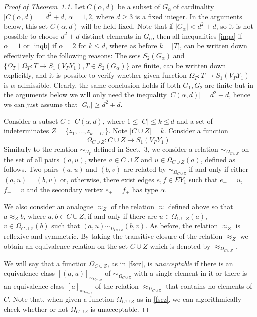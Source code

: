 \documentclass[10pt, reqno]{amsart}
\numberwithin{equation}{section}
\begin{document}
\begin{proof}[Proof of Theorem~1.1]
Let
$
C({\alpha}, d)
$
be a subset of $G_{\alpha}$ of cardinality $|C({\alpha}, d) | = d^2 +d$, ${\alpha} =1,2$, where $d \ge 3$ is a fixed integer.
In the arguments below, this set  $C({\alpha}, d)$  will be held fixed. Note that if $|G_{\alpha}| < d^2 +d$, so it is not possible to choose  $d^2 +d$ distinct elements in $G_{\alpha}$, then all inequalities \eqref{inqa} if ${\alpha} =1$ or $\eqref{inqb}$ if  ${\alpha} =2$  for $k \le d$, where as before $k = |T|$,  can be written down effectively for the following reasons: The sets
$S_2(G_{\alpha})$ and $\{ {{\Omega}}_T \mid {{\Omega}}_T : T \to S_1(V_P Y_1), T \in  S_2(G_{\alpha}) \} $ are finite, can be written down explicitly, and it is possible to verify whether given function
${{\Omega}}_T :  T  \to S_1(V_P Y_1) $ is ${\alpha}$-admissible. Clearly, the same conclusion holds if both $G_1, G_2$ are finite but in the arguments below we will only need the inequality $|C({\alpha}, d) | = d^2 +d$, hence we can just assume that $|G_{\alpha}| \ge d^2 +d$.

Consider a subset $C \subset  C({\alpha}, d)$, where $1 \le |C| \le k \le d$ and a set of indeterminates $Z = \{ z_1, \dots, z_{k-|C|} \}$. Note  $| C \cup Z | = k$.
Consider a function
\begin{equation}\label{fscz}
{{\Omega}}_{ C \cup Z} : C \cup Z \to S_1(V_P Y_1) .
\end{equation}
Similarly to the relation $\sim_{\Omega_T}$ defined in Sect.~3, we consider a relation $\sim_{{{\Omega}}_{ C \cup Z}}$ on the set of all pairs $(a, u)$, where $a \in C \cup Z$ and $u \in {{\Omega}}_{ C \cup Z}(a)$, defined as follows. Two pairs
$(a,u)$ and $(b,v)$ are related by $\sim_{{{\Omega}}_{ C \cup Z}}$  if and only if  either
$(a,u)=  (b,v)$ or, otherwise, there exist edges $e, f \in EY_1$ such that $e_- = u$, $f_- = v$ and the secondary vertex $e_+ = f_+$ has type ${\alpha}$.

We also consider an analogue  $\approx_Z$  of the relation $\approx$ defined above so that $a \approx_Z b$, where $a, b \in C\cup Z$, if and only if   there are  $u \in {{\Omega}}_{ C \cup Z}(a)$,  $v \in {{\Omega}}_{ C \cup Z}(b)$ such that $(a, u) \sim_{{{\Omega}}_{ C \cup Z}}  (b, v)$.
As before,  the  relation $\approx_Z$ is reflexive and symmetric.   By taking the transitive closure of the  relation $\approx_Z$ we obtain an equivalence relation on the set $C \cup Z$  which is denoted by $\approx_{{{\Omega}}_{ C \cup Z}}$.

We will say that a function ${{\Omega}}_{{ C \cup Z}}$, as in \eqref{fscz}, is {\em unacceptable} if there is an equivalence class $[(a, u)]_{\sim_{{{\Omega}}_{ C \cup Z}}}$ of $\sim_{{{\Omega}}_{ C \cup Z}}$ with a single element in it or there is  an  equivalence class $[a]_{\approx_{{{\Omega}}_{ C \cup Z}}}$  of the relation $\approx_{{{\Omega}}_{ C \cup Z}}$ that
contains no elements of $C$. Note that, when given a function ${{\Omega}}_{{ C \cup Z}}$ as in \eqref{fscz}, we can algorithmically check whether or not ${{\Omega}}_{{ C \cup Z}}$ is unacceptable.


\end{proof}
\end{document}
